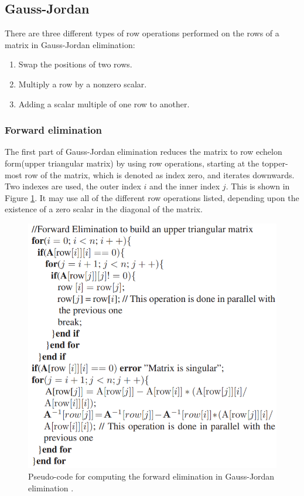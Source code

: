 \subsection{Gauss-Jordan}
There are three different types of row operations performed on the rows of a matrix in Gauss-Jordan elimination:
\begin{enumerate}
\item Swap the positions of two rows. 
\item Multiply a row by a nonzero scalar. 
\item Adding a scalar multiple of one row to another.
\end{enumerate}  

\subsubsection{Forward elimination}
The first part of Gauss-Jordan elimination reduces the matrix to row echelon form(upper triangular matrix) by using row operations, starting at the topper-most row of the matrix, which is denoted as index zero, and iterates downwards. Two indexes are used, the outer index $i$ and the inner index $j$. This is shown in Figure \ref{fig:forward_elimination_pseudocode}. It may use all of the different row operations listed, depending upon the existence of a zero scalar in the diagonal of the matrix.   

\begin{figure}[H]
\centering
   \includegraphics[scale=0.5]{images/forward_elimination_pseudocode.PNG}
  \caption{ Pseudo-code for computing the forward elimination in Gauss-Jordan elimination \cite{gauss_jordan_fpga}. } 
  \label{fig:forward_elimination_pseudocode}
\end{figure}



